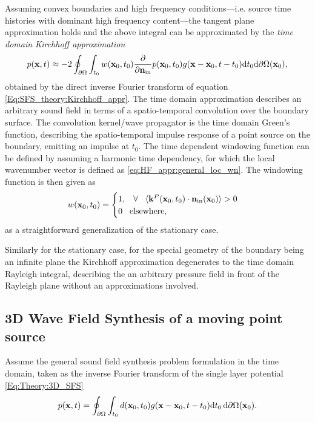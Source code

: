 Assuming convex boundaries and high frequency conditions---i.e. source time histories with dominant high frequency content---the tangent plane approximation  holds and the above integral can be approximated by the \emph{time domain Kirchhoff approximation}
\begin{equation}
\label{eq:theory:KA_td}
p(\mathbf{x},t) \approx -2 \oint_{\partial \Omega} \int_{t_0} w(\mathbf{x}_0,t_0) \frac{\partial}{\partial \mathbf{n}_{\mathrm{in}}}  p(\mathbf{x}_0,t_0) g(\mathbf{x} - \mathbf{x}_0, t - t_0) \mathrm{d} t_0 \mathrm{d} \partial \Omega(\mathbf{x}_0),
\end{equation}
obtained by the direct inverse Fourier transform of equation \eqref{Eq:SFS_theory:Kirchhoff_appr}.
The time domain approximation describes an arbitrary sound field in terms of a spatio-temporal convolution over the boundary surface.
The convolution kernel/wave propagator is the time domain Green's function, describing the spatio-temporal impulse response of a point source on the boundary, emitting an impulse at $t_0$.
The time dependent windowing function can be defined by assuming a harmonic time dependency, for which the local wavenumber vector is defined as \eqref{eq:HF_appr:general_loc_wn}.
The windowing function is then given as
\begin{equation}
w(\mathbf{x}_0,t_0) = \begin{cases}
                        1, \hspace{3mm} \forall \hspace{3mm} \langle \mathbf{k}^P(\mathbf{x}_0,t_0) \cdot \mathbf{n}_{\mathrm{in}}(\mathbf{x}_0) \rangle > 0 \\
                        0  \hspace{3mm} \text{elsewhere},
                    \end{cases}
\label{eq:theory:windowing_function}
\end{equation}
as a straightforward generalization of the stationary case.

Similarly for the stationary case, for the special geometry of the boundary being an infinite plane the Kirchhoff approximation degenerates to the time domain Rayleigh integral, describing the an arbitrary pressure field in front of the Rayleigh plane without an approximations involved.

\subsection{3D Wave Field Synthesis of a moving point source}

Assume the general sound field synthesis problem formulation in the time domain, taken as the inverse Fourier transform of the single layer potential \eqref{Eq:Theory:3D_SFS}
\begin{equation}
p(\mathbf{x},t) = \oint_{\partial \Omega} \int_{t_0} d(\mathbf{x}_0,t_0) g(\mathbf{x} - \mathbf{x}_0 , t-t_0 ) \mathrm{d} t_0 \, \mathrm{d} \partial \Omega ( \mathbf{x}_0 ).
\label{eq:moving_source:SFS_problem_td}
\end{equation}

